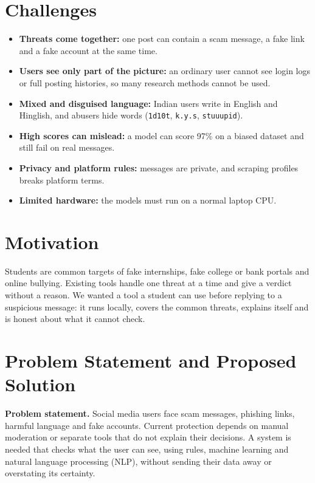 \section{Challenges}
\begin{itemize}
\item \textbf{Threats come together:} one post can contain a scam message, a fake link and a fake account at the same time.
\item \textbf{Users see only part of the picture:} an ordinary user cannot see login logs or full posting histories, so many research methods \cite{lit2} cannot be used.
\item \textbf{Mixed and disguised language:} Indian users write in English and Hinglish, and abusers hide words (\texttt{1d10t}, \texttt{k.y.s}, \texttt{stuuupid}).
\item \textbf{High scores can mislead:} a model can score 97\% on a biased dataset and still fail on real messages.
\item \textbf{Privacy and platform rules:} messages are private, and scraping profiles breaks platform terms.
\item \textbf{Limited hardware:} the models must run on a normal laptop CPU.
\end{itemize}

\section{Motivation}
\noindent Students are common targets of fake internships, fake college or bank portals and online bullying. Existing tools handle one threat at a time and give a verdict without a reason. We wanted a tool a student can use before replying to a suspicious message: it runs locally, covers the common threats, explains itself and is honest about what it cannot check.

\section{Problem Statement and Proposed Solution}
\noindent\textbf{Problem statement.} Social media users face scam messages, phishing links, harmful language and fake accounts. Current protection depends on manual moderation or separate tools that do not explain their decisions. A system is needed that checks what the user can see, using rules, machine learning and natural language processing (NLP), without sending their data away or overstating its certainty.\\


